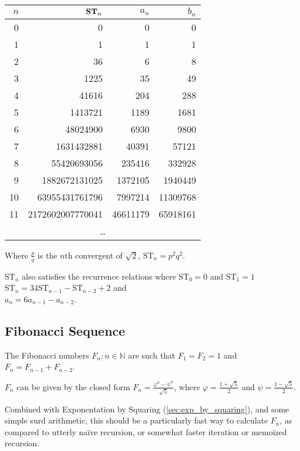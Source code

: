 \documentclass[a4paper,11pt]{article}
\begin{document}
    \begin{longtable}{rrrr}
    \toprule
    \boldmath$n$ & \boldmath$\text{\bfseries ST}_n$ & \boldmath$a_n$ &
                   \boldmath$b_n$ \\
    \midrule
    \endhead
    0 & 0 & 0 & 0 \\
    1 & 1 & 1 & 1 \\
    2 & 36 & 6 & 8 \\
    3 & 1225 & 35 & 49 \\
    4 & 41616 & 204 & 288 \\
    5 & 1413721 & 1189 & 1681 \\
    6 & 48024900 & 6930 & 9800 \\
    7 & 1631432881 & 40391 & 57121 \\
    8 & 55420693056 & 235416 & 332928 \\
    9 & 1882672131025 & 1372105 & 1940449 \\
    10 & 63955431761796 & 7997214 & 11309768 \\
    11 & 2172602007770041 & 46611179 & 65918161 \\
    \multicolumn{4}{c}{\ldots} \\
    \bottomrule
    \end{longtable}


    Where $\frac{p}{q}$ is the $n$th convergent of $\sqrt 2$,
    $\mathrm{ST}_n = p^2 q^2$.

    $\mathrm{ST}_n$ also satisfies the recurrence relations where
    $\mathrm{ST}_0 = 0$ and $\mathrm{ST}_1 = 1$
    \\$\mathrm{ST}_n = 34\mathrm{ST}_{n - 1} - \mathrm{ST}_{n - 2} + 2$ and
    \\$a_n = 6a_{n - 1} - a_{n - 2}$.

    \subsection{Fibonacci Sequence}

    The Fibonacci numbers $F_n: n \in \mathbb{N}$ are such that $F_1 = F_2 = 1$
    and $F_n = F_{n - 1} + F_{n - 2}$.

    $F_n$ can be given by the closed form
    $\displaystyle F_n = \frac{\varphi^n - \psi^n}{\sqrt 5}$, where
    $\displaystyle \varphi = \frac{1 + \sqrt 5} 2$ and
    $\displaystyle \psi = \frac{1 - \sqrt 5} 2$.

    Combined with Exponentation by Squaring (\ref{sec:exp_by_squaring}), and
    some simple surd arithmetic, this should be a particularly fast way to
    calculate $F_n$, as compared to utterly na\"ive recursion, or somewhat
    faster iteration or memoized recursion.
\end{document}
